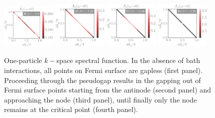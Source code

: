 \documentclass[reprint,hidelinks,onecolumn]{revtex4-2}
\begin{document}
\begin{figure}[htpb]
	\centering
	\includegraphics[width=0.23\textwidth]{kspaceDOS-1.pdf}
	\includegraphics[width=0.23\textwidth]{kspaceDOS-2.pdf}
	\includegraphics[width=0.23\textwidth]{kspaceDOS-3.pdf}
	\includegraphics[width=0.23\textwidth]{kspaceDOS-4.pdf}
	\caption{One-particle \(k-\)space spectral function. In the absence of bath interactions, all points on Fermi surface are gapless (first panel). Proceeding through the pseudogap results in the gapping out of Fermi surface points starting from the antinode (second panel) and approaching the node (third panel), until finally only the node remains at the critical point (fourth panel).}
	\label{tiledSpecFunc}
\end{figure}
\end{document}
